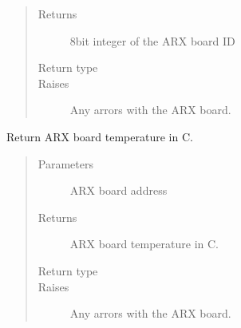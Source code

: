 \documentclass[letterpaper,10pt,english]{sphinxmanual}
\begin{document}
\begin{fulllineitems}
\begin{fulllineitems}
\begin{quote}
\begin{description}
\item[{Returns}] \leavevmode
8bit integer of the ARX board ID

\item[{Return type}] \leavevmode
{}

\item[{Raises}] \leavevmode
{} \textendash{} Any arrors with the ARX board.

\end{description}\end{quote}

\end{fulllineitems}


\begin{fulllineitems}
\label{\detokenize{index:lwautils.lwa_arx.ARX.get_board_temp}}
Return ARX board temperature in C.
\begin{quote}\begin{description}
\item[{Parameters}] \leavevmode
{} \textendash{} ARX board address

\item[{Returns}] \leavevmode
ARX board temperature in C.

\item[{Return type}] \leavevmode
{}

\item[{Raises}] \leavevmode
{} \textendash{} Any arrors with the ARX board.

\end{description}\end{quote}

\end{fulllineitems}



\end{fulllineitems}
\end{document}
